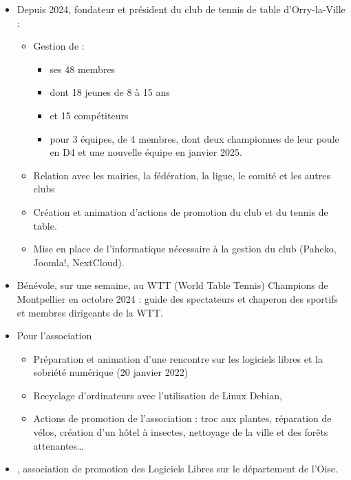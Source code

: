    \begin{itemize}
    	\item{Depuis 2024, fondateur et président du club de tennis de table d’Orry-la-Ville  :}
    	\begin{itemize}
    		\item{Gestion de :}
    		\begin{itemize}
    			\item{ses 48 membres}
    			\item{dont 18 jeunes de 8 à 15 ans}
    			\item{et 15 compétiteurs}
    			\item{pour 3 équipes, de 4 membres, dont deux championnes de leur poule en D4 et une nouvelle équipe en janvier 2025.}
    		\end{itemize}
    		\item{Relation avec les mairies, la fédération, la ligue, le comité et les autres clubs}
    		\item{Création et animation d’actions de promotion du club et du tennis de table.}
    		\item{Mise en place de l’informatique nécessaire à la gestion du club (Paheko, Joomla!, NextCloud).}
		\end{itemize}
		\item{Bénévole, sur une semaine, au WTT (World Table Tennis) Champions de Montpellier en octobre 2024 : guide des spectateurs et chaperon des sportifs et membres dirigeants de la WTT.}
		\item{Pour l'association }
            \begin{itemize}
                \item{Préparation et animation d'une rencontre sur les logiciels libres et la sobriété numérique (20 janvier 2022)}
                \item{Recyclage d'ordinateurs avec l'utilisation de Linux Debian,}
                \item{Actions de promotion de l'association : troc aux plantes, réparation de vélos, création d'un hôtel à insectes, nettoyage de la ville et des forêts attenantes\ldots}
            \end{itemize}
        \item{, association de promotion des Logiciels Libres sur le département de l'Oise.}
            \begin{itemize}

\end{itemize}
\end{itemize}
